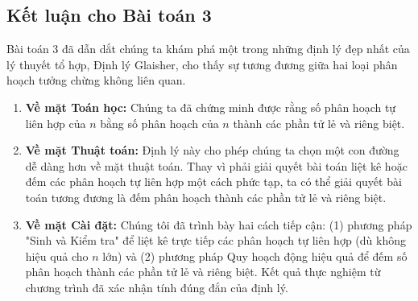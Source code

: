 \documentclass[a4paper,12pt]{article}
\begin{document}
\subsection{Kết luận cho Bài toán 3}
Bài toán 3 đã dẫn dắt chúng ta khám phá một trong những định lý đẹp nhất của lý thuyết tổ hợp, Định lý Glaisher, cho thấy sự tương đương giữa hai loại phân hoạch tưởng chừng không liên quan.
\begin{enumerate}
    \item \textbf{Về mặt Toán học:} Chúng ta đã chứng minh được rằng số phân hoạch tự liên hợp của $n$ bằng số phân hoạch của $n$ thành các phần tử lẻ và riêng biệt.
    \item \textbf{Về mặt Thuật toán:} Định lý này cho phép chúng ta chọn một con đường dễ dàng hơn về mặt thuật toán. Thay vì phải giải quyết bài toán liệt kê hoặc đếm các phân hoạch tự liên hợp một cách phức tạp, ta có thể giải quyết bài toán tương đương là đếm phân hoạch thành các phần tử lẻ và riêng biệt.
    \item \textbf{Về mặt Cài đặt:} Chúng tôi đã trình bày hai cách tiếp cận: (1) phương pháp "Sinh và Kiểm tra" để liệt kê trực tiếp các phân hoạch tự liên hợp (dù không hiệu quả cho $n$ lớn) và (2) phương pháp Quy hoạch động hiệu quả để đếm số phân hoạch thành các phần tử lẻ và riêng biệt. Kết quả thực nghiệm từ chương trình đã xác nhận tính đúng đắn của định lý.
\end{enumerate}
\end{document}
